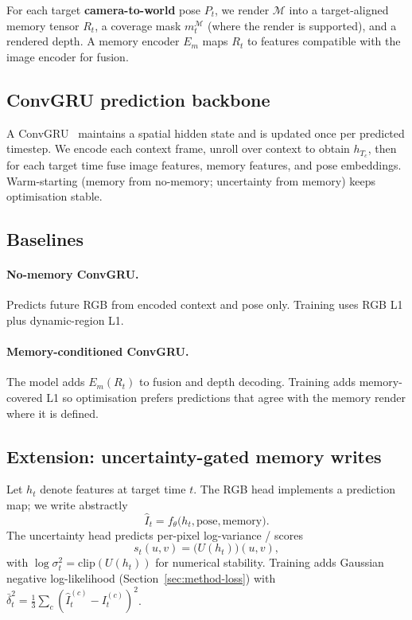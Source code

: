 \documentclass[11pt]{article}
\begin{document}
For each target \textbf{camera-to-world} pose $P_t$, we render $\mathcal{M}$ into a target-aligned memory tensor $R_t$, a coverage
mask $m^{\mathcal{M}}_t$ (where the render is supported), and a rendered depth. A memory encoder $E_m$
maps $R_t$ to features compatible with the image encoder for fusion.

\subsection{ConvGRU prediction backbone}

A ConvGRU~\cite{convgru} maintains a spatial hidden state and is updated once per predicted timestep. We
encode each context frame, unroll over context to obtain $h_{T_c}$, then for each target time fuse image
features, memory features, and pose embeddings. Warm-starting (memory from no-memory; uncertainty from
memory) keeps optimisation stable.

\subsection{Baselines}

\paragraph{No-memory ConvGRU.}
Predicts future RGB from encoded context and pose only. Training uses RGB L1 plus dynamic-region L1.

\paragraph{Memory-conditioned ConvGRU.}
The model adds $E_m(R_t)$ to fusion and depth decoding. Training adds memory-covered L1 so optimisation
prefers predictions that agree with the memory render where it is defined.

\subsection{Extension: uncertainty-gated memory writes}
\label{sec:method-uncertainty}

Let $h_t$ denote features at target time $t$. The RGB head implements a prediction map; we write abstractly
\begin{equation}
\hat I_t = f_\theta\bigl(h_t, \text{pose}, \text{memory}\bigr).
\end{equation}
The uncertainty head predicts per-pixel log-variance / scores
\begin{equation}
s_t(u,v) = \bigl(U(h_t)\bigr)(u,v),
\end{equation}
with $\log\sigma_t^2 = \mathrm{clip}(U(h_t))$ for numerical stability. Training adds Gaussian negative
log-likelihood (Section~\ref{sec:method-loss}) with
$\bar{\delta}_t^2 = \frac{1}{3}\sum_c (\hat I_t^{(c)} - I_t^{(c)})^2$.
\end{document}
